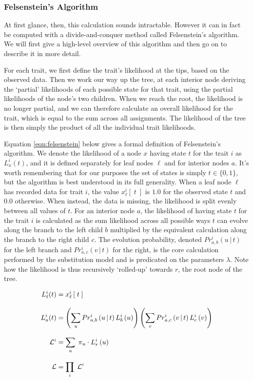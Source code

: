 \documentclass[10pt,journal,compsoc]{IEEEtran}
\begin{document}
\subsubsection{Felsenstein's Algorithm}

At first glance, then, this calculation sounds intractable. However it can in fact be computed with a divide-and-conquer method called Felsenstein's algorithm. We will first give a high-level overview of this algorithm and then go on to describe it in more detail.

For each trait, we first define the trait's likelihood at the tips, based on the observed data. Then we work our way up the tree, at each interior node deriving the `partial' likelihoods of each possible state for that trait, using the partial likelihoods of the node's two children. When we reach the root, the likelihood is no longer partial, and we can therefore calculate an overall likelihood for the trait, which is equal to the sum across all assignments. The likelihood of the tree is then simply the product of all the individual trait likelihoods\cite{felsenstein2004inferring}.

Equation \eqref{eqn:felsenstein} below gives a formal definition of Felsenstein's algorithm. We denote the likelihood of a node $x$ having state $t$ for the trait $i$ as $L_x^{i}(t)$, and it is defined separately for leaf nodes $\ell$ and for interior nodes $a$. It's worth remembering that for our purposes the set of states is simply $t \in \{0, 1\}$, but the algorithm is best understood in its full generality. When a leaf node $\ell$ has recorded data for trait $i$, the value $x_\ell^{i}\left[\;t\;\right]$ is $1.0$ for the observed state $t$ and $0.0$ otherwise. When instead, the data is missing, the likelihood is split evenly between all values of $t$. For an interior node $a$, the likelihood of having state $t$ for the trait $i$ is calculated as the sum likelihood across all possible ways $t$ can evolve along the branch to the left child $b$ multiplied by the equivalent calculation along the branch to the right child $c$. The evolution probability, denoted $Pr^i_{a,b}\left(u\,\vert\,t\right)$ for the left branch and $Pr^i_{a,c}\left(v\,\vert\,t\right)$ for the right, is the core calculation performed by the substitution model and is predicated on the parameters $\lambda$. Note how the likelihood is thus recursively `rolled-up' towards $r$, the root node of the tree.

\begin{equation}\label{eqn:felsenstein}
    \setlength{\jot}{12px}
    \begin{split}
        L_\ell^{i}(t) &= x_\ell^{i}\left[\;t\;\right] \\
        L_a^{i}(t) &= \left(\sum_uPr^i_{a,b}\left(u\,\vert\,t\right)L_b^{i}\left(u\right)\right)\left(\sum_vPr^i_{a,c}\left(v\,\vert\,t\right)L_c^{i}\left(v\right)\right) \\
        \mathcal{L}^{i} &= \sum_u \;\pi_u \cdot L_r^{i}\left(u\right) \\
        \mathcal{L} &= \prod_i \;\mathcal{L}^i
    \end{split}
\end{equation}
\end{document}
